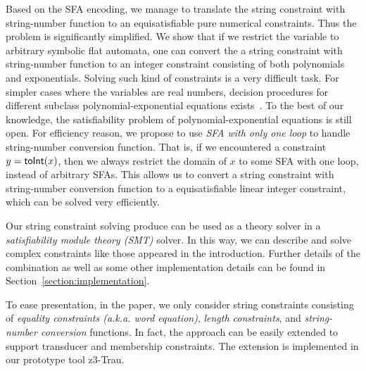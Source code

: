 \documentclass[sigplan,review,anonymous]{acmart}\settopmatter{printfolios=true,printccs=false,printacmref=false}
\begin{document}
Based on the SFA encoding, we manage to translate the string constraint with string-number function to an equisatisfiable pure numerical constraints. Thus the problem is significantly simplified. We show that if we restrict the variable to arbitrary symbolic flat automata, one can convert the a string constraint with string-number function to an integer constraint consisting of both polynomials and exponentials. Solving such kind of constraints is a very difficult task. For simpler cases where the variables are real numbers, decision procedures for different subclass polynomial-exponential equations exists~\cite{gan2015decidability,kincaid2019closed,achatz2008deciding}. To the best of our knowledge, the satisfiability problem of polynomial-exponential equations is still open. For efficiency reason, we propose to use \emph{SFA with only one loop} to handle string-number conversion function. That is, if we encountered a constraint $y=\mbox{\textsf{toInt}($x$)}$, then we always restrict the domain of $x$ to some SFA with one loop, instead of arbitrary SFAs. This allows us to convert a string constraint with string-number conversion function to a equisatisfiable linear integer constraint, which can be solved very efficiently. 

Our string constraint solving produce can be used as a theory solver in a \emph{satisfiability module theory (SMT)} solver. In this way, we can describe and solve complex constraints like those appeared in the introduction. Further details of the combination as well as some other implementation details can be found in Section~\ref{section:implementation}.



To ease presentation, in the paper, we only consider string constraints consisting of \emph{equality constraints (a.k.a. word equation)}, \emph{length constraints}, and \emph{string-number conversion} functions. In fact, the approach can be easily extended to support transducer and membership constraints. The extension is implemented in our prototype tool \textsf{z3-Trau}. 
\end{document}
